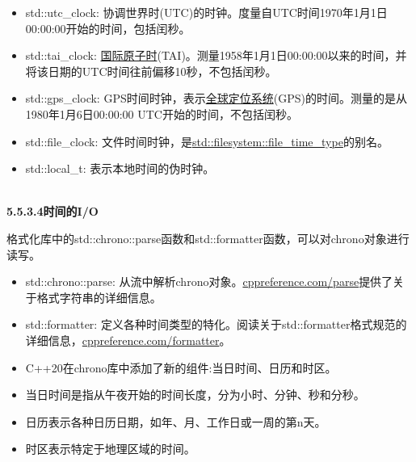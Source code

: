 \begin{itemize}
\item 
std::utc\_clock: 协调世界时(UTC)的时钟。度量自UTC时间1970年1月1日00:00:00开始的时间，包括闰秒。

\item 
std::tai\_clock: \href{https://en.wikipedia.org/wiki/International_Atomic_Time}{国际原子时}(TAI)。测量1958年1月1日00:00:00以来的时间，并将该日期的UTC时间往前偏移10秒，不包括闰秒。

\item 
std::gps\_clock: GPS时间时钟，表示\href{https://en.wikipedia.org/wiki/Global_Positioning_System}{全球定位系统}(GPS)的时间。测量的是从1980年1月6日00:00:00 UTC开始的时间，不包括闰秒。

\item 
std::file\_clock: 文件时间时钟，是\href{https://en.cppreference.com/w/cpp/filesystem/file_time_type}{std::filesystem::file\_time\_type}的别名。

\item 
std::local\_t: 表示本地时间的伪时钟。
\end{itemize}


\hspace*{\fill} \\ %
\noindent
\textbf{5.5.3.4\hspace{0.2cm}时间的I/O}

格式化库中的std::chrono::parse函数和std::formatter函数，可以对chrono对象进行读写。

\begin{itemize}
\item 
std::chrono::parse: 从流中解析chrono对象。\href{https://en.cppreference.com/w/cpp/chrono/parse}{cppreference.com/parse}提供了关于格式字符串的详细信息。

\item 
std::formatter: 定义各种时间类型的特化。阅读关于std::formatter格式规范的详细信息，\href{https://en.cppreference.com/w/cpp/chrono/system_clock/formatter#Format_specification}{cppreference.com/formatter}。
\end{itemize}

\begin{tcolorbox}[breakable,enhanced jigsaw,colback=mygreen!5!white,colframe=mygreen!75!black,title={总结}]

\begin{itemize}
\item 
C++20在chrono库中添加了新的组件:当日时间、日历和时区。

\item 
当日时间是指从午夜开始的时间长度，分为小时、分钟、秒和分秒。

\item 
日历表示各种日历日期，如年、月、工作日或一周的第n天。

\item 
时区表示特定于地理区域的时间。
\end{itemize}

\end{tcolorbox}

\newpage






